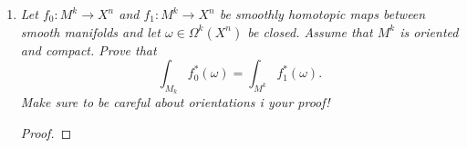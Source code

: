 \documentclass{article}
\begin{document}
\begin{enumerate}[label={\bf Q\arabic*:}]
    \begin{proof}
    \end{proof}

  \item \it Let $f_0:M^k\rightarrow X^n$ and $f_1:M^k\rightarrow X^n$ be
    smoothly homotopic maps between smooth manifolds and let
    $\omega\in\Omega^k(X^n)$ be closed. Assume that $M^k$ is oriented and
    compact. Prove that
    \[\int_{M_k} f_0^*(\omega)= \int_{M^k} f_1^*(\omega).\]
    Make sure to be careful about orientations i your proof!

    \begin{proof}
    \end{proof}
\end{enumerate}
\end{document}

